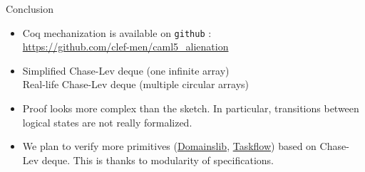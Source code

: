 \begin{frame}{Conclusion}
\begin{itemize}
	\setlength\itemsep{2em}
	\item
		Coq mechanization is available on \texttt{github} : \\
		\url{https://github.com/clef-men/caml5_alienation}
	\item
		Simplified Chase-Lev deque (one infinite array) \hfill {} \\
		Real-life Chase-Lev deque (multiple circular arrays) \hfill {}
	\item
		Proof looks more complex than the sketch.
		In particular, transitions between logical states are not really formalized.
	\item
		We plan to verify more primitives (\href{https://github.com/ocaml-multicore/domainslib}{Domainslib}, \href{https://github.com/taskflow/taskflow}{Taskflow}) based on Chase-Lev deque.
		This is thanks to modularity of \Iris specifications.
\end{itemize}
\end{frame}